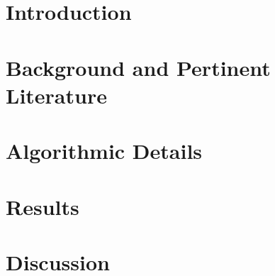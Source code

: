 \documentclass{article}
\begin{document}
\begin{abstract}

\end{abstract}

\section{Introduction}


\section{Background and Pertinent Literature}


\section{Algorithmic Details}


\section{Results}


\section{Discussion}




\end{document}
